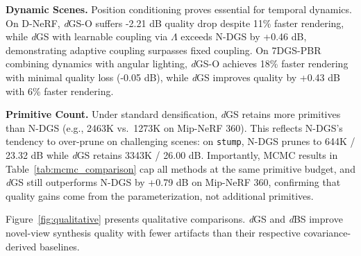\documentclass{article}
\newcommand{\dgs}{\textit{d}GS\xspace}
\newcommand{\dbs}{\textit{d}BS\xspace}
\theoremstyle{plain}
\theoremstyle{definition}
\theoremstyle{remark}
\begin{document}
\textbf{Dynamic Scenes.}
Position conditioning proves essential for temporal dynamics. On D-NeRF, \textit{d}GS-O suffers -2.21 dB quality drop despite 11\% faster rendering, while \textit{d}GS with learnable coupling via $\Lambda$ exceeds N-DGS by +0.46 dB, demonstrating adaptive coupling surpasses fixed coupling. On 7DGS-PBR combining dynamics with angular lighting, \textit{d}GS-O achieves 18\% faster rendering with minimal quality loss (-0.05 dB), while \textit{d}GS improves quality by +0.43 dB with 6\% faster rendering.

\textbf{Primitive Count.} Under standard densification, \dgs{} retains more primitives than N-DGS (e.g., 2463K vs.\ 1273K on Mip-NeRF 360). This reflects N-DGS's tendency to over-prune on challenging scenes: on \texttt{stump}, N-DGS prunes to 644K / 23.32 dB while \dgs{} retains 3343K / 26.00 dB. Importantly, MCMC results in Table~\ref{tab:mcmc_comparison} cap all methods at the same primitive budget, and \dgs{} still outperforms N-DGS by +0.79 dB on Mip-NeRF 360, confirming that quality gains come from the parameterization, not additional primitives.

Figure~\ref{fig:qualitative} presents qualitative comparisons. \dgs{} and \dbs{} improve novel-view synthesis quality with fewer artifacts than their respective covariance-derived baselines.

\begin{table}[!t]
\centering
\caption{Ablation study on NeRF Synthetic and 6DGS-PBR datasets. $\Lambda{=}0$ corresponds to \textit{d}GS-O (opacity only), $\Lambda{=}1$ fixes full coupling, and learned $\Lambda$ is the full \textit{d}GS. ``w/o $\bar{s}$'' removes spatial scaling from displacement.}
\label{tab:ablation}
\setlength{\tabcolsep}{4pt}
%
\vspace{-1em}
\end{table}
\end{document}
